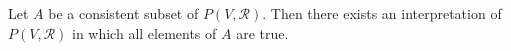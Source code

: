 Let $A$ be a consistent subset of $P(V, \mathcal{R})$. Then there exists an interpretation of $P(V, \mathcal{R})$ in which all elements of $A$ are true.
